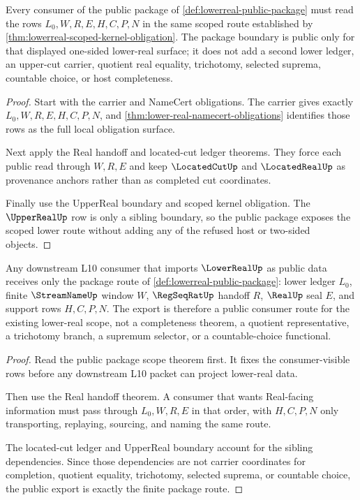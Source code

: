 \begin{theorem}
\label{thm:lowerreal-public-package-scope}
Every consumer of the public package of \autoref{def:lowerreal-public-package} must read the rows $L_0,W,R,E,H,C,P,N$ in the same scoped route established by \autoref{thm:lowerreal-scoped-kernel-obligation}. The package boundary is public only for that displayed one-sided lower-real surface; it does not add a second lower ledger, an upper-cut carrier, quotient real equality, trichotomy, selected suprema, countable choice, or host completeness.
\end{theorem}
\begin{proof}
Start with the carrier and NameCert obligations. The carrier gives exactly $L_0,W,R,E,H,C,P,N$, and \autoref{thm:lower-real-namecert-obligations} identifies those rows as the full local obligation surface.

Next apply the Real handoff and located-cut ledger theorems. They force each public read through $W,R,E$ and keep $\LocatedCutUp$ and $\LocatedRealUp$ as provenance anchors rather than as completed cut coordinates.

Finally use the UpperReal boundary and scoped kernel obligation. The $\UpperRealUp$ row is only a sibling boundary, so the public package exposes the scoped lower route without adding any of the refused host or two-sided objects.
\end{proof}

\begin{theorem}
\label{thm:lowerreal-public-consumer-export}
Any downstream L10 consumer that imports $\LowerRealUp$ as public data receives only the package route of \autoref{def:lowerreal-public-package}: lower ledger $L_0$, finite $\StreamNameUp$ window $W$, $\RegSeqRatUp$ handoff $R$, $\RealUp$ seal $E$, and support rows $H,C,P,N$. The export is therefore a public consumer route for the existing lower-real scope, not a completeness theorem, a quotient representative, a trichotomy branch, a supremum selector, or a countable-choice functional.
\end{theorem}
\begin{proof}
Read the public package scope theorem first. It fixes the consumer-visible rows before any downstream L10 packet can project lower-real data.

Then use the Real handoff theorem. A consumer that wants Real-facing information must pass through $L_0,W,R,E$ in that order, with $H,C,P,N$ only transporting, replaying, sourcing, and naming the same route.

The located-cut ledger and UpperReal boundary account for the sibling dependencies. Since those dependencies are not carrier coordinates for completion, quotient equality, trichotomy, selected suprema, or countable choice, the public export is exactly the finite package route.
\end{proof}

